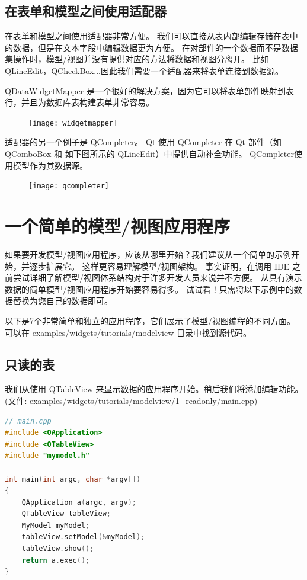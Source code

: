 \subsection{在表单和模型之间使用适配器}

在表单和模型之间使用适配器非常方便。
我们可以直接从表内部编辑存储在表中的数据，但是在文本字段中编辑数据更为方便。
在对部件的一个数据而不是数据集操作时，模型/视图并没有提供对应的方法将数据和视图分离开。
比如 QLineEdit，QCheckBox...因此我们需要一个适配器来将表单连接到数据源。

QDataWidgetMapper 是一个很好的解决方案，因为它可以将表单部件映射到表行，并且为数据库表构建表单非常容易。

\begin{figure}[hbt!]  
\texttt{[image: widgetmapper]}
\end{figure}

适配器的另一个例子是 QCompleter。
Qt 使用 QCompleter 在 Qt 部件（如 QComboBox 和 如下图所示的 QLineEdit）中提供自动补全功能。
QCompleter使用模型作为其数据源。
	
\begin{figure}[hbt!]  
\texttt{[image: qcompleter]}
\end{figure}

\section{一个简单的模型/视图应用程序}

如果要开发模型/视图应用程序，应该从哪里开始？我们建议从一个简单的示例开始，并逐步扩展它。
这样更容易理解模型/视图架构。
事实证明，在调用 IDE 之前尝试详细了解模型/视图体系结构对于许多开发人员来说并不方便。
从具有演示数据的简单模型/视图应用程序开始要容易得多。
试试看！只需将以下示例中的数据替换为您自己的数据即可。

以下是7个非常简单和独立的应用程序，它们展示了模型/视图编程的不同方面。
可以在 examples/widgets/tutorials/modelview 目录中找到源代码。

\subsection{只读的表}

我们从使用 QTableView 来显示数据的应用程序开始。稍后我们将添加编辑功能。
(文件: examples/widgets/tutorials/modelview/1\_readonly/main.cpp)

\begin{lstlisting}[language=C++]
// main.cpp
#include <QApplication>
#include <QTableView>
#include "mymodel.h"
	
int main(int argc, char *argv[])
{
	QApplication a(argc, argv);
	QTableView tableView;
	MyModel myModel;
	tableView.setModel(&myModel);
	tableView.show();
	return a.exec();
}
\end{lstlisting}

